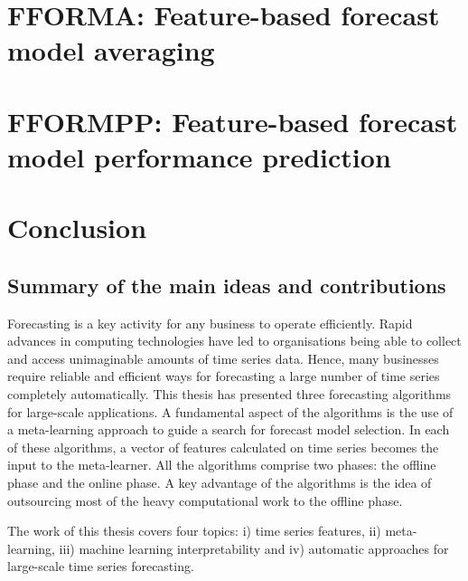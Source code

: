 \documentclass{monashthesis}
\begin{document}
\hypertarget{ch:paper4}{%
\chapter{FFORMA: Feature-based forecast model averaging}\label{ch:paper4}}



\hypertarget{ch:paper5}{%
\chapter{FFORMPP: Feature-based forecast model performance prediction}\label{ch:paper5}}



\hypertarget{ch:paper6}{%
\chapter{Conclusion}\label{ch:paper6}}

\hypertarget{summary-of-the-main-ideas-and-contributions}{%
\section{Summary of the main ideas and contributions}\label{summary-of-the-main-ideas-and-contributions}}

Forecasting is a key activity for any business to operate efficiently. Rapid advances in computing technologies have led to organisations being able to collect and access unimaginable amounts of time series data. Hence, many businesses require reliable and efficient ways for forecasting a large number of time series completely automatically. This thesis has presented three forecasting algorithms for large-scale applications. A fundamental aspect of the algorithms is the use of a meta-learning approach to guide a search for forecast model selection. In each of these algorithms, a vector of features calculated on time series becomes the input to the meta-learner. All the algorithms comprise two phases: the offline phase and the online phase. A key advantage of the algorithms is the idea of outsourcing most of the heavy computational work to the offline phase.

The work of this thesis covers four topics: i) time series features, ii) meta-learning, iii) machine learning interpretability and iv) automatic approaches for large-scale time series forecasting.
\end{document}

